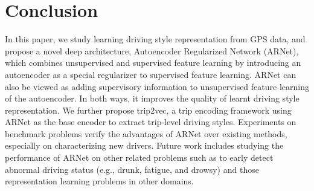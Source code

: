 \documentclass{article}
\begin{document}
\section{Conclusion}
In this paper, we study learning driving style representation from GPS data, and propose a novel deep architecture, Autoencoder Regularized Network (ARNet), which combines unsupervised and supervised feature learning by introducing an autoencoder as a special regularizer to supervised feature learning.
ARNet can also be viewed as adding supervisory information to unsupervised feature learning of the autoencoder.
In both ways, it improves the quality of learnt driving style representation.
We further propose trip2vec, a trip encoding framework using ARNet as the base encoder to extract trip-level driving styles.
Experiments on benchmark problems verify the advantages of ARNet over existing methods, especially on characterizing new drivers.
Future work includes studying the performance of ARNet on other related problems such as to early detect abnormal driving status (e.g., drunk, fatigue, and drowsy) and those representation learning problems in other domains.

\clearpage
\small



\end{document}

